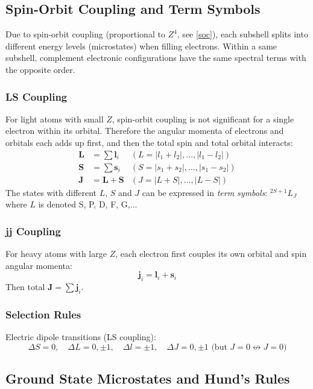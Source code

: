 \subsection{Spin-Orbit Coupling and Term Symbols}\label{spectral term}

Due to spin-orbit coupling (proportional to $Z^4$, see \ref{soc}), each subshell splits into different energy levels (microstates) when filling electrons.
Within a same subshell, complement electronic configurations have the same spectral terms with the opposite order.

\subsubsection{LS Coupling}
For light atoms with small $Z$, spin-orbit coupling is not significant for a single electron within its orbital. Therefore the angular momenta of electrons and orbitals each adds up first, and then the total spin and total orbital interacts:
\begin{align*}
    \mathbf{L} &= \sum \mathbf{l}_i  {}&(L = |l_1 + l_2|, \ldots, |l_1 - l_2|) \\
    \mathbf{S} &= \sum \mathbf{s}_i  {}&(S = |s_1 + s_2|, \ldots, |s_1 - s_2|) \\
    \mathbf{J} &= \mathbf{L} + \mathbf{S}  {}&(J = |L+S|, \ldots, |L-S|)
\end{align*}
The states with different $L$, $S$ and $J$ can be expressed in \emph{term symbols}: $\boxed{{}^{2S+1}L_J}$ where $L$ is denoted S, P, D, F, G,...

\subsubsection{jj Coupling}

For heavy atoms with large $Z$, each electron first couples its own orbital and spin angular momenta:
\[
    \mathbf{j}_i = \mathbf{l}_i + \mathbf{s}_i
\]
Then total $\mathbf{J} = \sum \mathbf{j}_i$.

\subsubsection{Selection Rules}

Electric dipole transitions (LS coupling):
\[
    \Delta S = 0, \quad \Delta L = 0, \pm 1, \quad \Delta l = \pm 1, \quad \Delta J = 0, \pm 1 \text{ (but } J=0 \nleftrightarrow J=0\text{)}
\]

\subsection{Ground State Microstates and Hund's Rules}

